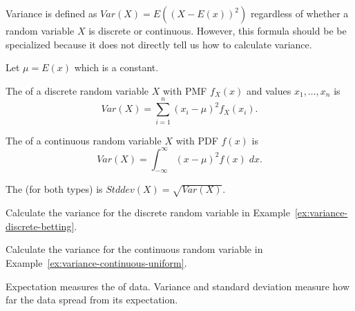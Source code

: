 \documentclass[../main.tex]{subfiles}
\begin{document}
Variance is defined as \(Var(X) = E( (X - E(x))^{2} )\) regardless of whether a random variable \(X\) is discrete or continuous. However, this formula should be be specialized because it does not directly tell us how to calculate variance.
\begin{definition}
  Let \(\mu = E(x)\) which is a constant.

  The  of a discrete random variable \(X\) with PMF \(f_{X}(x)\) and values \(x_{1}, \ldots, x_{n}\) is 
  \begin{equation} \label{def:variance-discrete}
    Var(X) = \sum_{i=1}^{n} (x_{i} - \mu)^{2} f_{X}(x_{i}).
  \end{equation}

  The  of a continuous random variable \(X\) with PDF \(f(x)\) is 
  \begin{equation} \label{def:variance-continuous}
    Var(X) = \int_{-\infty}^{\infty} (x - \mu)^{2} f(x) \;dx.
  \end{equation}

  The  (for both types) is \(Stddev(X) = \sqrt{Var(X)}\).
\end{definition}

\begin{example}
  Calculate the variance for the discrete random variable in Example~\ref{ex:variance-discrete-betting}.

\end{example}

\begin{example}
  Calculate the variance for the continuous random variable in Example~\ref{ex:variance-continuous-uniform}.

\end{example}
\clearpage

\faStar{} Expectation measures the  of data. Variance and standard deviation measure how far the data spread from its expectation.
\end{document}
